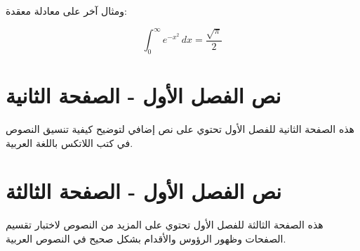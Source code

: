 ومثال آخر على معادلة معقدة:

\begin{equation}
    \int_0^\infty e^{-x^2} \, dx = \frac{\sqrt{\pi}}{2}
\end{equation}

\newpage

\section{نص الفصل الأول - الصفحة الثانية}

هذه الصفحة الثانية للفصل الأول تحتوي على نص إضافي لتوضيح كيفية تنسيق النصوص في كتب اللاتكس باللغة العربية.

\newpage

\section{نص الفصل الأول - الصفحة الثالثة}

هذه الصفحة الثالثة للفصل الأول تحتوي على المزيد من النصوص لاختبار تقسيم الصفحات وظهور الرؤوس والأقدام بشكل صحيح في النصوص العربية.
